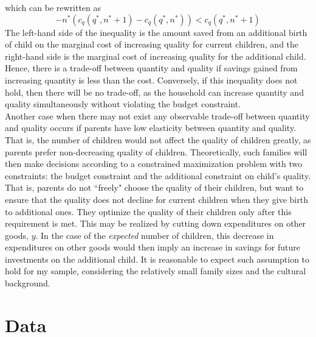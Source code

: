 \documentclass[12pt]{extarticle}
\begin{document}
which can be rewritten as
$$-n^{*}(c_{q}(q^{*},n^{*}+1)-c_{q}(q^{*},n^{*})) < c_{q}(q^{*},n^{*}+1)$$
The left-hand side of the inequality is the amount saved from an additional birth of child on the marginal cost of increasing quality for current children, and the right-hand side is the marginal cost of increasing quality for the additional child. Hence, there is a trade-off between quantity and quality if savings gained from increasing quantity is less than the cost. Conversely, if this inequality does not hold, then there will be no trade-off, as the household can increase quantity and quality simultaneously without violating the budget constraint. \\
\indent Another case when there may not exist any observable trade-off between quantity and quality occurs if parents have low elasticity between quantity and quality. That is, the number of children would not affect the quality of children greatly, as parents prefer non-decreasing quality of children. Theoretically, such families will then make decisions according to a constrained maximization problem with two constraints: the budget constraint and the additional constraint on child's quality. That is, parents do not ``freely" choose the quality of their children, but want to ensure that the quality does not decline for current children when they give birth to additional ones. They optimize the quality of their children only after this requirement is met. This may be realized by cutting down expenditures on other goods, $y$. In the case of the \textit{expected} number of children, this decrease in expenditures on other goods would then imply an increase in savings for future investments on the additional child. It is reasonable to expect such assumption to hold for my sample, considering the relatively small family sizes and the cultural background.

\section{Data}
\end{document}
